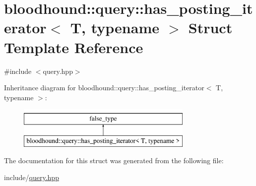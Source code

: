 \hypertarget{structbloodhound_1_1query_1_1has__posting__iterator}{}\section{bloodhound\+:\+:query\+:\+:has\+\_\+posting\+\_\+iterator$<$ T, typename $>$ Struct Template Reference}
\label{structbloodhound_1_1query_1_1has__posting__iterator}


{\ttfamily \#include $<$query.\+hpp$>$}

Inheritance diagram for bloodhound\+:\+:query\+:\+:has\+\_\+posting\+\_\+iterator$<$ T, typename $>$\+:\begin{figure}[H]
\begin{center}
\leavevmode
\includegraphics[height=2.000000cm]{structbloodhound_1_1query_1_1has__posting__iterator}
\end{center}
\end{figure}


The documentation for this struct was generated from the following file\+:\begin{DoxyCompactItemize}
\item 
include/\hyperlink{query_8hpp}{query.\+hpp}\end{DoxyCompactItemize}
